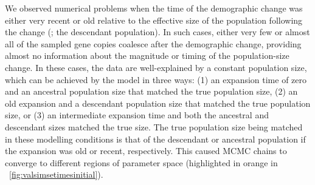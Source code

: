 We observed numerical problems when the time of the demographic change was
either very recent or old relative to the effective size of the population
following the change
(\epopsize[\descendantpopindex{}]; the descendant population).
In such cases, either very few or almost all of the sampled gene copies
coalesce after the demographic change,
providing almost no information about the magnitude or
timing of the population-size change.
In these cases, the data are well-explained by a constant population size,
which can be achieved by the model in three ways:
(1) an expansion time of zero and an ancestral population
size that matched the true population size,
(2) an old expansion and a descendant population size that matched the true
population size,
or (3) an intermediate expansion time and both the ancestral and descendant
sizes matched the true size.
The true population size being matched in these modelling conditions is that of
the descendant or ancestral population if the expansion was old or recent,
respectively.
This caused MCMC chains to converge to different regions of parameter
space
(highlighted in orange in \fig{}~\ref{fig:valsimsetimesinitial}).


